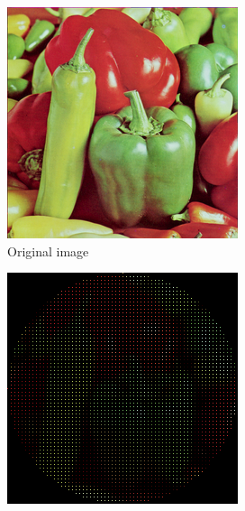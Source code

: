 \begin{figure}[tbh]
    \centering
    \begin{subfigure}{.49\textwidth}
        \centering
    \includegraphics[width=\textwidth]{figures/pepper_color_256.png}
    \caption{Original image}
    \end{subfigure}
    \begin{subfigure}{.49\textwidth}
        \centering
    \includegraphics[width=\textwidth]{figures/pepper_square.png}

\end{subfigure}
\end{figure}
